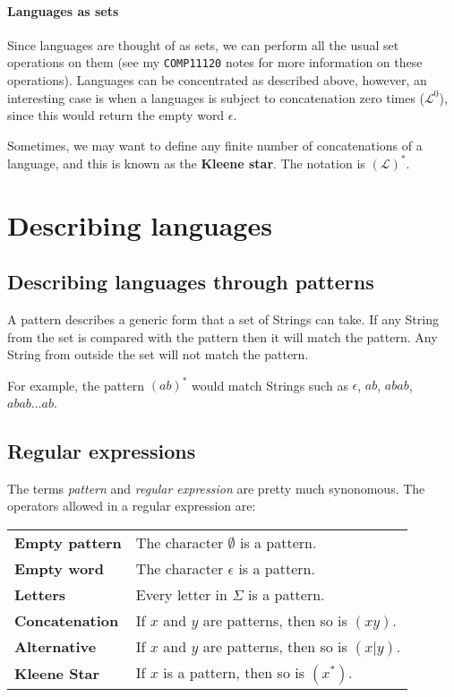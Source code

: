 \paragraph{Languages as sets} Since languages are thought of as sets, we can
perform all the usual set operations on them (see my {\tt COMP11120} notes for
more information on these operations). Languages can be concentrated as
described above, however, an interesting case is when a languages is subject to
concatenation zero times ($\mathcal{L}^0$), since this would return the empty
word $\epsilon$.

Sometimes, we may want to define any finite number of concatenations of a
language, and this is known as the {\bf Kleene star}. The notation is
$(\mathcal{L})^*$.


\section{Describing languages}

\subsection{Describing languages through patterns}

A pattern describes a generic form that a set of Strings can take. If any String
from the set is compared with the pattern then it will match the pattern. Any
String from outside the set will not match the pattern.

For example, the pattern $(ab)^*$ would match Strings such as $\epsilon$, $ab$,
$abab$, $abab \dots ab$.


\subsection{Regular expressions}

The terms {\it pattern} and {\it regular expression} are pretty much synonomous.
The operators allowed in a regular expression are:

\begin{center}
	\begin{tabular}{>{\bfseries} l l}
		Empty pattern & The character $\emptyset$ is a pattern.\\
		Empty word & The character $\epsilon$ is a pattern.\\
		Letters & Every letter in $\Sigma$ is a pattern.\\
		\rowcolor{Gray}
		Concatenation & If $x$ and $y$ are patterns, then so is $(xy)$.\\
		\rowcolor{Gray}
		Alternative & If $x$ and $y$ are patterns, then so is $(x|y)$.\\
		\rowcolor{Gray}
		Kleene Star & If $x$ is a pattern, then so is $(x^*)$.
	\end{tabular}
\end{center}

